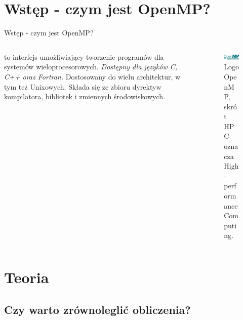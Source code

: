 \documentclass{if-beamer}
\begin{document}
\section{Wstęp - czym jest OpenMP?}
\begin{frame}{Wstęp - czym jest OpenMP?}

\begin{columns}

\begin{column}{0.6\textwidth}
\textbf{} to interfejs umożliwiający tworzenie programów dla systemów wieloprocesorowych. \emph{Dostępny dla języków C, C++ oraz Fortran.} Dostosowany do wielu architektur, w tym też Unixowych. Składa się ze zbioru dyrektyw kompilatora, bibliotek i zmiennych środowiskowych.
\end{column}

\begin{column}{0.4\textwidth}

\begin{figure}
\centering
\includegraphics[scale=0.1]{openmp.png}
\caption{Logo OpenMP, skrót HPC oznacza High-performance Computing.}
\end{figure}

\end{column}

\end{columns}
\end{frame}

\section{Teoria}

\subsection{Czy warto zrównoleglić obliczenia?}
\end{document}
